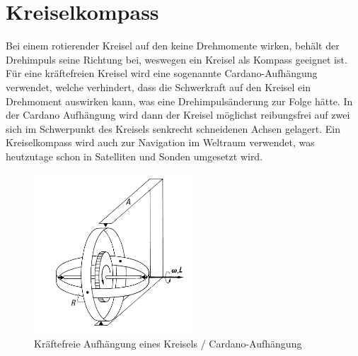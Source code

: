 

\section{Kreiselkompass}
Bei einem rotierender Kreisel auf den keine Drehmomente wirken, behält der Drehimpuls seine Richtung bei, weswegen ein Kreisel als Kompass geeignet ist. Für eine kräftefreien Kreisel wird eine sogenannte \dq Cardano-Aufhängung\dq{} verwendet, welche verhindert, dass die Schwerkraft auf den Kreisel ein Drehmoment auswirken kann, was eine Drehimpulsänderung zur Folge hätte. In der Cardano Aufhängung wird dann der Kreisel möglichst reibungsfrei auf zwei sich im Schwerpunkt des Kreisels senkrecht schneidenen Achsen gelagert. Ein Kreiselkompass wird auch zur Navigation im Weltraum verwendet, was heutzutage schon in Satelliten und Sonden umgesetzt wird.
\begin{figure}[h]
    \centering
    \includegraphics[width = 6cm]{Bilder/Kraeftefreie_Aufhaengung.PNG}
    \caption[Caption for LOF]{Kräftefreie Aufhängung eines Kreisels / Cardano-Aufhängung \footnotemark}
\end{figure}
